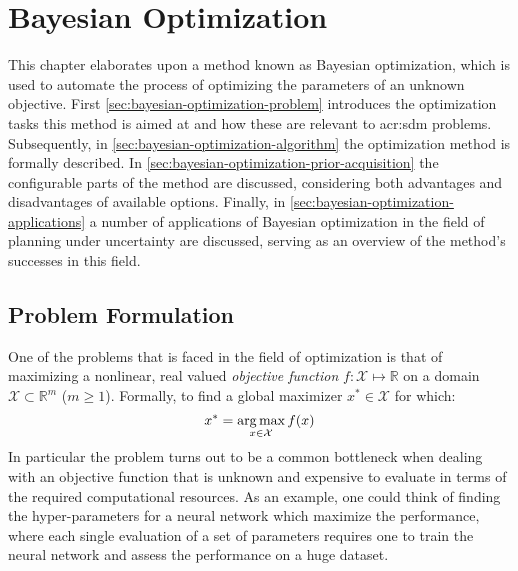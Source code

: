 \chapter{Bayesian Optimization}
\label{ch:bayesian-optimization}
This chapter elaborates upon a method known as Bayesian optimization, which is used to automate the process of optimizing the parameters of an unknown objective.
First \autoref{sec:bayesian-optimization-problem} introduces the optimization tasks this method is aimed at and how these are relevant to \acrshort{acr:sdm} problems.
Subsequently, in \autoref{sec:bayesian-optimization-algorithm} the optimization method is formally described.
In \autoref{sec:bayesian-optimization-prior-acquisition} the configurable parts of the method are discussed, considering both advantages and disadvantages of available options.
Finally, in \autoref{sec:bayesian-optimization-applications} a number of applications of Bayesian optimization in the field of planning under uncertainty are discussed, serving as an overview of the method's successes in this field.


\section{Problem Formulation}
\label{sec:bayesian-optimization-problem}

One of the problems that is faced in the field of optimization is that of maximizing a nonlinear, real valued \textit{objective function} $f: \mathcal{X} \mapsto \mathbb{R}$ on a domain $\mathcal{X} \subset \mathbb{R}^m$ ($m \geq 1$).
Formally, to find a global maximizer $x^\ast \in \mathcal{X}$ for which:
\begin{equation}
	x^\ast = \operatorname*{arg\,max}_{x \in \mathcal{X}} f(x)
\end{equation}
In particular the problem turns out to be a common bottleneck when dealing with an objective function that is unknown and expensive to evaluate in terms of the required computational resources.
As an example, one could think of finding the hyper-parameters for a neural network which maximize the performance, where each single evaluation of a set of parameters requires one to train the neural network and assess the performance on a huge dataset.


